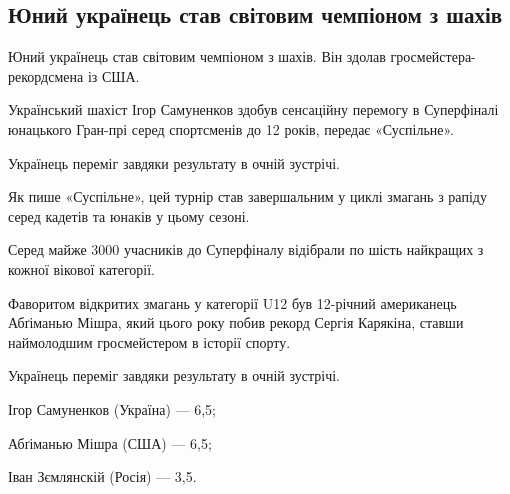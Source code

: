  
 
 
 
 
\subsection{Юний українець став світовим чемпіоном з шахів}
\label{sec:25_12_2021.stz.news.ua.volyn.1.chess_ukrainec_pobeda}


\begin{multicols}{2} %
\setlength{\parindent}{0pt}


Юний українець став світовим чемпіоном з шахів. Він здолав гросмейстера-рекордсмена із США.

Український шахіст Ігор Самуненков здобув сенсаційну перемогу в Суперфіналі
юнацького Гран-прі серед спортсменів до 12 років, передає «Суспільне».

\begin{zznagolos}
Українець переміг завдяки результату в очній зустрічі.	
\end{zznagolos}

Як пише «Суспільне», цей турнір став завершальним у циклі змагань з рапіду
серед кадетів та юнаків у цьому сезоні.

Серед майже 3000 учасників до Суперфіналу відібрали по шість найкращих з кожної
вікової категорії.

Фаворитом відкритих змагань у категорії U12 був 12-річний американець Абґіманью
Мішра, який цього року побив рекорд Сергія Карякіна, ставши наймолодшим
гросмейстером в історії спорту.

Українець переміг завдяки результату в очній зустрічі.

Ігор Самуненков (Україна) — 6,5;

Абґіманью Мішра (США) — 6,5;

Іван Зємлянскій (Росія) — 3,5.
\end{multicols} %
